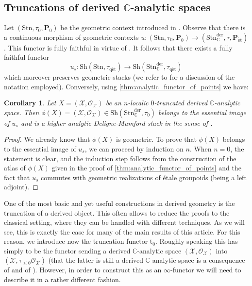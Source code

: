 \documentclass[12pt,a4paper,reqno]{amsart}
\theoremstyle{plain}
\newtheorem{cor}[thm]{Corollary}
\theoremstyle{definition}
\theoremstyle{remark}
\numberwithin{equation}{section}
\begin{document}
\subsection{Truncations of derived {$\mathbb C$-analytic\xspace} spaces} \label{subsec:truncation_of_derived_spaces}

Let $(\mathrm{Stn}, \tau_0, \mathbf P_0)$ be the geometric context introduced in \cite[Â§3.2]{Porta_Yu_Higher_analytic_stacks_2014}.
Observe that there is a continuous morphism of geometric contexts $u \colon (\mathrm{Stn}, \tau_0, \mathbf P_0) \to ({\mathrm{Stn}^{\mathrm{der}}_{\mathbb C}}, \tau, \mathbf P_{\mathrm{\acute{e}t}})$.
This functor is fully faithful in virtue of \cite[Theorem 12.8]{DAG-IX}.
It follows that there exists a fully faithful functor
\[ u_s \colon {\mathrm{Sh}}(\mathrm{Stn}, {\tau_\mathrm{q\acute{e}t}}) \to {\mathrm{Sh}}({\mathrm{Stn}^{\mathrm{der}}_{\mathbb C}}, {\tau_\mathrm{q\acute{e}t}}) \]
which moreover preserves geometric stacks (we refer to \cite[Â§2.4]{Porta_Yu_Higher_analytic_stacks_2014} for a discussion of the notation employed).
Conversely, using \cref{thm:analytic_functor_of_points} we have:

\begin{cor} \label{cor:comparison_analytic_DM_stacks}
	Let $X = ({\mathcal X}, {\mathcal O}_{\mathcal X})$ be an $n$-localic $0$-truncated derived {$\mathbb C$-analytic\xspace} space.
	Then $\phi(X) = ({\mathcal X}, {\mathcal O}_{\mathcal X}) \in {\mathrm{Sh}}({\mathrm{Stn}^{\mathrm{der}}_{\mathbb C}}, \tau_0)$ belongs to the essential image of $u_s$ and is a higher analytic {Deligne-Mumford\xspace} stack in the sense of \cite{Porta_Yu_Higher_analytic_stacks_2014}.
\end{cor}

\begin{proof}
	We already know that $\phi(X)$ is geometric.
	To prove that $\phi(X)$ belongs to the essential image of $u_s$, we can proceed by induction on $n$.
	When $n = 0$, the statement is clear, and the induction step follows from the construction of the atlas of $\phi(X)$ given in the proof of \cref{thm:analytic_functor_of_points} and the fact that $u_s$ commutes with geometric realizations of \'etale groupoids (being a left adjoint).
\end{proof}

One of the most basic and yet useful constructions in derived geometry is the truncation of a derived object.
This often allows to reduce the proofs to the classical setting, where they can be handled with different techniques.
As we will see, this is exactly the case for many of the main results of this article.
For this reason, we introduce now the truncation functor ${\mathrm{t}_0}$.
Roughly speaking this has simply to be the functor sending a derived {$\mathbb C$-analytic\xspace} space $({\mathcal X}, {\mathcal O}_{\mathcal X})$ into $({\mathcal X}, \tau_{\le 0} {\mathcal O}_{\mathcal X})$ (that the latter is still a derived {$\mathbb C$-analytic\xspace} space is a consequence of \cite[Proposition 3.3.3]{DAG-V} and of \cite[Proposition 11.4]{DAG-IX}).
However, in order to construct this as an $\infty$-functor we will need to describe it in a rather different fashion.
\end{document}
